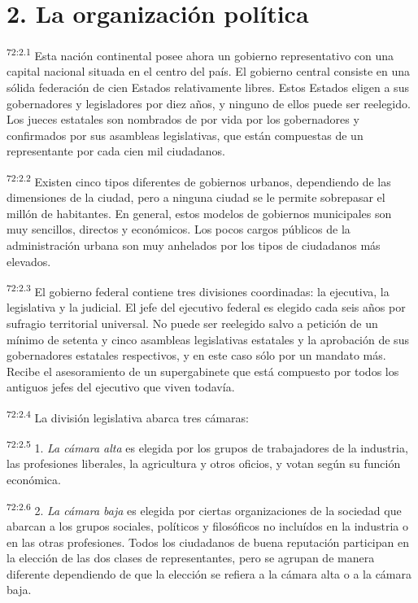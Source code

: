 \section*{2. La organización política}
\par
\textsuperscript{72:2.1} Esta nación continental posee ahora un gobierno representativo con una capital nacional situada en el centro del país. El gobierno central consiste en una sólida federación de cien Estados relativamente libres. Estos Estados eligen a sus gobernadores y legisladores por diez años, y ninguno de ellos puede ser reelegido. Los jueces estatales son nombrados de por vida por los gobernadores y confirmados por sus asambleas legislativas, que están compuestas de un representante por cada cien mil ciudadanos.

\par
\textsuperscript{72:2.2} Existen cinco tipos diferentes de gobiernos urbanos, dependiendo de las dimensiones de la ciudad, pero a ninguna ciudad se le permite sobrepasar el millón de habitantes. En general, estos modelos de gobiernos municipales son muy sencillos, directos y económicos. Los pocos cargos públicos de la administración urbana son muy anhelados por los tipos de ciudadanos más elevados.

\par
\textsuperscript{72:2.3} El gobierno federal contiene tres divisiones coordinadas: la ejecutiva, la legislativa y la judicial. El jefe del ejecutivo federal es elegido cada seis años por sufragio territorial universal. No puede ser reelegido salvo a petición de un mínimo de setenta y cinco asambleas legislativas estatales y la aprobación de sus gobernadores estatales respectivos, y en este caso sólo por un mandato más. Recibe el asesoramiento de un supergabinete que está compuesto por todos los antiguos jefes del ejecutivo que viven todavía.

\par
\textsuperscript{72:2.4} La división legislativa abarca tres cámaras:

\par
\textsuperscript{72:2.5} 1. \textit{La cámara alta} es elegida por los grupos de trabajadores de la industria, las profesiones liberales, la agricultura y otros oficios, y votan según su función económica.

\par
\textsuperscript{72:2.6} 2. \textit{La cámara baja} es elegida por ciertas organizaciones de la sociedad que abarcan a los grupos sociales, políticos y filosóficos no incluídos en la industria o en las otras profesiones. Todos los ciudadanos de buena reputación participan en la elección de las dos clases de representantes, pero se agrupan de manera diferente dependiendo de que la elección se refiera a la cámara alta o a la cámara baja.

